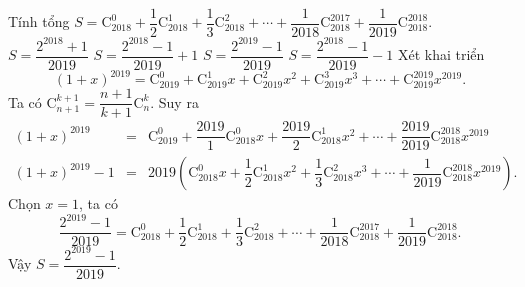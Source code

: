 \begin{ex}%
Tính tổng $S=\mathrm{C}_{2018}^0 + \dfrac{1}{2}\mathrm{C}_{2018}^1 + \dfrac{1}{3}\mathrm{C}_{2018}^2 + \cdots + \dfrac{1}{2018}\mathrm{C}_{2018}^{2017} + \dfrac{1}{2019}\mathrm{C}_{2018}^{2018}$.
\choice
{$S=\dfrac{2^{2018} + 1}{2019}$}
{$S=\dfrac{2^{2018}-1}{2019} + 1$}
{\True $S=\dfrac{2^{2019}-1}{2019}$}
{$S=\dfrac{2^{2018}-1}{2019}-1$}
\loigiai
{
Xét khai triển
$$(1+x)^{2019}=\mathrm{C}_{2019}^0+\mathrm{C}_{2019}^1x+\mathrm{C}_{2019}^2x^2+\mathrm{C}_{2019}^3x^3+\cdots+\mathrm{C}_{2019}^{2019}x^{2019}.$$
Ta có $\mathrm{C}_{n+1}^{k+1}=\dfrac{n+1}{k+1}\mathrm{C}_n^k$. Suy ra\\
\allowdisplaybreaks
\begin{eqnarray*}
(1+x)^{2019}&=&\mathrm{C}_{2019}^0+\dfrac{2019}{1}\mathrm{C}_{2018}^0x+\dfrac{2019}{2}\mathrm{C}_{2018}^1x^2+\cdots+\dfrac{2019}{2019}\mathrm{C}_{2018}^{2018}x^{2019} \\
(1+x)^{2019}-1&=&2019\left(\mathrm{C}_{2018}^0x+\dfrac{1}{2}\mathrm{C}_{2018}^1x^2+\dfrac{1}{3}\mathrm{C}_{2018}^2x^3+\cdots+\dfrac{1}{2019}\mathrm{C}_{2018}^{2018}x^{2019}\right).
\end{eqnarray*}
Chọn $x=1$, ta có
\[\dfrac{2^{2019}-1}{2019}=\mathrm{C}_{2018}^0 + \dfrac{1}{2}\mathrm{C}_{2018}^1 + \dfrac{1}{3}\mathrm{C}_{2018}^2 + \cdots + \dfrac{1}{2018}\mathrm{C}_{2018}^{2017} + \dfrac{1}{2019}\mathrm{C}_{2018}^{2018}.\]
Vậy $S=\dfrac{2^{2019}-1}{2019}$.
}
\end{ex}


